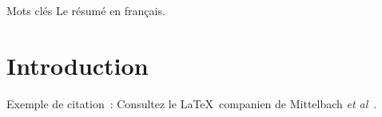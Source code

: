 \maketitle

\begin{resume}{Mots clés}
  Le résumé en français.
\end{resume}

\begin{abstract}{Key words}
  The english abstract.
\end{abstract}

\section{Introduction}

Exemple de citation~: Consultez le \LaTeX\ companien
de Mittelbach {\it et al\/}~\cite{exemple}.


\endinput
